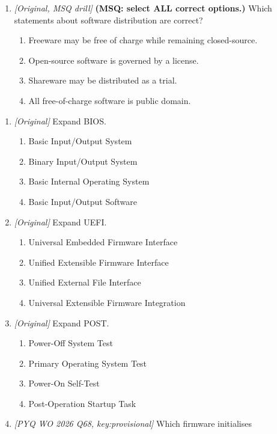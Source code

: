\begin{enumerate}[label=\textbf{Q\arabic*.}, leftmargin=*]
\item \textit{[Original, MSQ drill]} \textbf{(MSQ: select ALL correct options.)} Which statements about software distribution are correct?
  \begin{enumerate}[label=\Alph*.]
\item Freeware may be free of charge while remaining closed-source.
   \item Open-source software is governed by a license.
   \item Shareware may be distributed as a trial.
   \item All free-of-charge software is public domain.
  \end{enumerate}

\end{enumerate}
\begin{enumerate}[label=\textbf{Q\arabic*.}, leftmargin=*]
\item \textit{[Original]} Expand BIOS.
  \begin{enumerate}[label=\Alph*.]
    \item Basic Input/Output System
    \item Binary Input/Output System
    \item Basic Internal Operating System
    \item Basic Input/Output Software
  \end{enumerate}
\item \textit{[Original]} Expand UEFI.
  \begin{enumerate}[label=\Alph*.]
    \item Universal Embedded Firmware Interface
    \item Unified Extensible Firmware Interface
    \item Unified External File Interface
    \item Universal Extensible Firmware Integration
  \end{enumerate}
\item \textit{[Original]} Expand POST.
  \begin{enumerate}[label=\Alph*.]
    \item Power-Off System Test
    \item Primary Operating System Test
    \item Power-On Self-Test
    \item Post-Operation Startup Task
  \end{enumerate}
\item \textit{[PYQ WO 2026 Q68, key:provisional]} Which firmware initialises

\end{enumerate}
